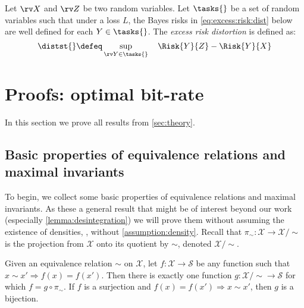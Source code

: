 \documentclass[final]{article}
\begin{document}
\begin{definition}\label{def:excess_distortion}
Let $\rv X$ and $\rv Z$ be two random variables.
Let $\tasks{}$ be a set of random variables such that under a loss $L$, the Bayes risks in \eqref{eq:excess:risk:dist} below are well defined for each $Y \in \tasks{}$.
The \textit{excess risk distortion} \disttext{} is defined as:
\begin{equation} \label{eq:excess:risk:dist}
\distst{} \defeq \sup_{\rv Y \in \tasks{}} \quad  \Risk{Y}{Z} - \Risk{Y}{X}
\end{equation}
\end{definition}





\clearpage
\newpage 
\section{Proofs: optimal bit-rate}
\label{appx:proofs}


In this section we prove all results from \cref{sec:theory}. 

\subsection{Basic properties of equivalence relations and maximal invariants}
\label{appx:maximal:invariants}

To begin, we collect some basic properties of equivalence relations and maximal invariants.
As these a general result that might be of interest beyond our work (especially \cref{lemma:desintegration}) we will prove them without assuming the existence of densities, \ie, without \cref{assumption:density}.
Recall that $\pi_{\sim} \colon \mathcal{X} \to \mathcal{X}/\sim$ is the projection from $\mathcal{X}$ onto its quotient by $\sim$, denoted $\mathcal{X}/\sim$.


\begin{lemma}
\label{lemma:projection:theorem}
Given an equivalence relation $\sim$ on $\mathcal{X}$, let $f \colon \mathcal{X} \to \mathcal{S}$ be any function such that $x\sim x' \Rightarrow f(x) = f(x')$. Then there is exactly one function $g \colon \mathcal{X}/\sim \to \mathcal{S}$ for which $f = g \circ \pi_{\sim}$. If $f$ is a surjection and $f(x) = f(x') \Rightarrow x \sim x'$, then $g$ is a bijection.
\end{lemma}
\end{document}
